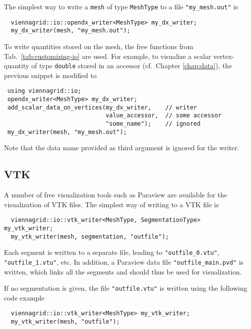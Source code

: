  The simplest way to write a \lstinline|mesh| of type \lstinline|MeshType| to a file \lstinline|"my_mesh.out"| is
 \begin{lstlisting}
  viennagrid::io::opendx_writer<MeshType> my_dx_writer;
  my_dx_writer(mesh, "my_mesh.out");
 \end{lstlisting}
 
 \pagebreak
 
 To write quantities stored on the mesh, the free functions from Tab.~\ref{tab:customizing-io} are used.
 For example, to visualize a scalar vertex-quantity of type \lstinline|double| stored in an accessor (cf.~Chapter \ref{chap:data}), the previous snippet is modified to
 \begin{lstlisting}
 using viennagrid::io;
 opendx_writer<MeshType> my_dx_writer;
 add_scalar_data_on_vertices(my_dx_writer,    // writer
                             value_accessor,  // some accessor
                             "some_name");    // ignored
 my_dx_writer(mesh, "my_mesh.out");
 \end{lstlisting}
 Note that the data name provided as third argument is ignored for the {\OpenDX} writer.


 \subsection{VTK}
 A number of free visualization tools such as Paraview \cite{paraview} are available for the visualization of VTK files.
 The simplest way of writing to a VTK file is 
 \begin{lstlisting}
  viennagrid::io::vtk_writer<MeshType, SegmentationType> my_vtk_writer;
  my_vtk_writer(mesh, segmentation, "outfile");
 \end{lstlisting}
 Each segment is written to a separate file, leading to \lstinline|"outfile_0.vtu"|, \lstinline|"outfile_1.vtu"|, etc. In addition,
 a Paraview data file \lstinline|"outfile_main.pvd"| is written, which links all the segments and should thus be used for visualization.
 
 If no segmentation is given, the file \lstinline|"outfile.vtu"| is written using the following code example
 \begin{lstlisting}
  viennagrid::io::vtk_writer<MeshType> my_vtk_writer;
  my_vtk_writer(mesh, "outfile");
 \end{lstlisting}


